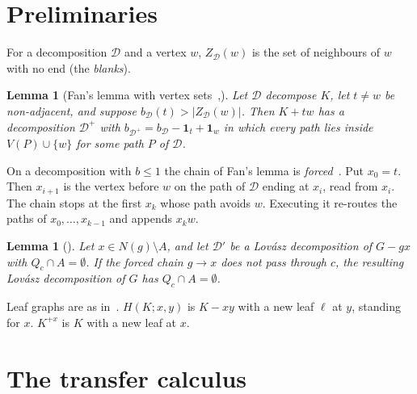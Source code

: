 \documentclass[11pt]{amsart}
\newtheorem{lemma}[theorem]{Lemma}
\theoremstyle{definition}
\newcommand{\cD}{\mathcal D}
\begin{document}
\section{Preliminaries}\label{sec:prelim}

For a decomposition $\cD$ and a vertex $w$, $Z_\cD(w)$ is the set of neighbours of $w$ with no end
(the \emph{blanks}).

\begin{lemma}[Fan's lemma with vertex sets~{\cite{Fan05},\cite[Lemma~2.2]{RD}}]\label{lem:fan}
Let $\cD$ decompose $K$, let $t\ne w$ be non-adjacent, and suppose $b_\cD(t)>|Z_\cD(w)|$. Then
$K+tw$ has a decomposition $\cD^+$ with $b_{\cD^+}=b_\cD-\mathbf 1_t+\mathbf 1_w$ in which every
path lies inside $V(P)\cup\{w\}$ for some path $P$ of $\cD$.
\end{lemma}

On a decomposition with $b\le1$ the chain of Fan's lemma is \emph{forced}~\cite[Prop.~2.1]{TF}.
Put $x_0=t$. Then $x_{i+1}$ is the vertex before $w$ on the path of $\cD$ ending at $x_i$, read
from $x_i$.
The chain stops at the first $x_k$ whose path avoids $w$. Executing it re-routes the paths of
$x_0,\dots,x_{k-1}$ and appends $x_kw$.

\begin{lemma}[{\cite[Lemma~3.2]{TF}}]\label{lem:avoidc}
Let $x\in N(g)\setminus A$, and let $\cD'$ be a Lov\'asz decomposition of $G-gx$ with $Q_c\cap
A=\emptyset$. If the forced chain $g\to x$ does not pass through $c$, the resulting Lov\'asz
decomposition of $G$ has $Q_c\cap A=\emptyset$.
\end{lemma}

Leaf graphs are as in~\cite{L1S}. $H(K;x,y)$ is $K-xy$ with a new leaf $\ell$ at $y$, standing for
$x$. $K^{+x}$ is $K$ with a new leaf at $x$.

\section{The transfer calculus}\label{sec:calculus}
\end{document}
